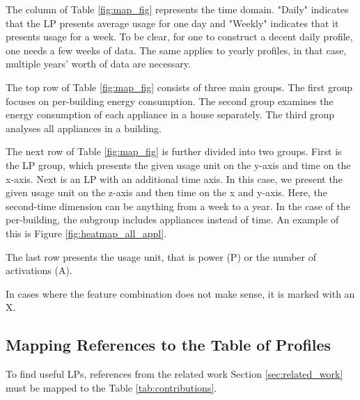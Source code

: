 The column of Table \ref{fig:map_fig} represents the time domain.
"Daily" indicates that the LP presents average usage for one day and "Weekly" indicates that it presents usage for a week.
To be clear, for one to construct a decent daily profile, one needs a few weeks of data. 
The same applies to yearly profiles, in that case, multiple years' worth of data are necessary.
 
The top row of Table \ref{fig:map_fig} consists of three main groups.
The first group focuses on per-building energy consumption.
The second group examines the energy consumption of each appliance in a house separately.
The third group analyses all appliances in a building.

The next row of Table \ref{fig:map_fig} is further divided into two groups. 
First is the LP group, which presents the given usage unit on the y-axis and time on the x-axis. 
Next is an LP with an additional time axis. 
In this case, we present the given usage unit on the z-axis and then time on the x and y-axis.
Here, the second-time dimension can be anything from a week to a year.
In the case of the per-building, the subgroup includes appliances instead of time. 
An example of this is Figure \ref{fig:heatmap_all_appl}.

The last row presents the usage unit, that is power (P) or the number of activations (A).

In cases where the feature combination does not make sense, it is marked with an X.

\subsection{Mapping References to the Table of Profiles}

To find useful LPs, references from the related work Section \ref{sec:related_work} must be mapped to the Table \ref{tab:contributions}.

